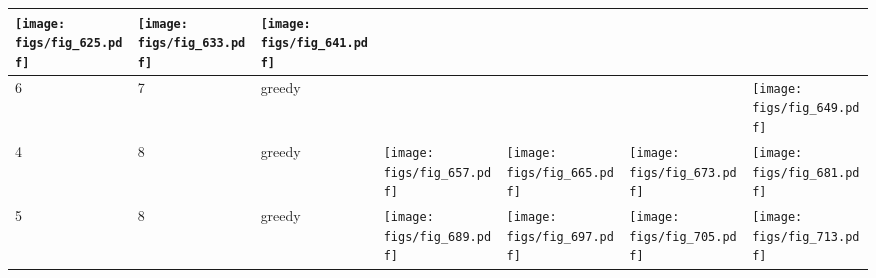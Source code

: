 \documentclass[oneside,canadian,landscape]{article}
\begin{document}
\begin{center}
\begin{longtable}{|l|l|l||l|l|l|l|}
\begin{minipage}{3.5cm}
\texttt{[image: figs/fig\_625.pdf]}
\end{minipage}
&\begin{minipage}{3.5cm}
\texttt{[image: figs/fig\_633.pdf]}
\end{minipage}
&\begin{minipage}{3.5cm}
\texttt{[image: figs/fig\_641.pdf]}
\end{minipage}
\\ \hline
6&7&greedy&&&&\begin{minipage}{3.5cm}
\texttt{[image: figs/fig\_649.pdf]}
\end{minipage}
\\ \hline
4&8&greedy&\begin{minipage}{3.5cm}
\texttt{[image: figs/fig\_657.pdf]}
\end{minipage}
&\begin{minipage}{3.5cm}
\texttt{[image: figs/fig\_665.pdf]}
\end{minipage}
&\begin{minipage}{3.5cm}
\texttt{[image: figs/fig\_673.pdf]}
\end{minipage}
&\begin{minipage}{3.5cm}
\texttt{[image: figs/fig\_681.pdf]}
\end{minipage}
\\ \hline
5&8&greedy&\begin{minipage}{3.5cm}
\texttt{[image: figs/fig\_689.pdf]}
\end{minipage}
&\begin{minipage}{3.5cm}
\texttt{[image: figs/fig\_697.pdf]}
\end{minipage}
&\begin{minipage}{3.5cm}
\texttt{[image: figs/fig\_705.pdf]}
\end{minipage}
&\begin{minipage}{3.5cm}
\texttt{[image: figs/fig\_713.pdf]}
\end{minipage}
\\ \hline
\end{longtable}
\end{center}
\end{document}
